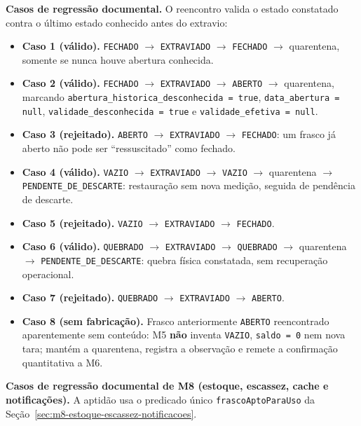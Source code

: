 \textbf{Casos de regressão documental.} O reencontro valida o estado constatado contra o último estado conhecido antes do extravio:
\begin{itemize}
    \item \textbf{Caso 1 (válido).} \texttt{FECHADO} $\rightarrow$ \texttt{EXTRAVIADO} $\rightarrow$ \texttt{FECHADO} $\rightarrow$ quarentena, somente se nunca houve abertura conhecida.
    \item \textbf{Caso 2 (válido).} \texttt{FECHADO} $\rightarrow$ \texttt{EXTRAVIADO} $\rightarrow$ \texttt{ABERTO} $\rightarrow$ quarentena, marcando \texttt{abertura\_historica\_desconhecida = true}, \texttt{data\_abertura = null}, \texttt{validade\_desconhecida = true} e \texttt{validade\_efetiva = null}.
    \item \textbf{Caso 3 (rejeitado).} \texttt{ABERTO} $\rightarrow$ \texttt{EXTRAVIADO} $\rightarrow$ \texttt{FECHADO}: um frasco já aberto não pode ser ``ressuscitado'' como fechado.
    \item \textbf{Caso 4 (válido).} \texttt{VAZIO} $\rightarrow$ \texttt{EXTRAVIADO} $\rightarrow$ \texttt{VAZIO} $\rightarrow$ quarentena $\rightarrow$ \texttt{PENDENTE\_DE\_DESCARTE}: restauração sem nova medição, seguida de pendência de descarte.
    \item \textbf{Caso 5 (rejeitado).} \texttt{VAZIO} $\rightarrow$ \texttt{EXTRAVIADO} $\rightarrow$ \texttt{FECHADO}.
    \item \textbf{Caso 6 (válido).} \texttt{QUEBRADO} $\rightarrow$ \texttt{EXTRAVIADO} $\rightarrow$ \texttt{QUEBRADO} $\rightarrow$ quarentena $\rightarrow$ \texttt{PENDENTE\_DE\_DESCARTE}: quebra física constatada, sem recuperação operacional.
    \item \textbf{Caso 7 (rejeitado).} \texttt{QUEBRADO} $\rightarrow$ \texttt{EXTRAVIADO} $\rightarrow$ \texttt{ABERTO}.
    \item \textbf{Caso 8 (sem fabricação).} Frasco anteriormente \texttt{ABERTO} reencontrado aparentemente sem conteúdo: M5 \textbf{não} inventa \texttt{VAZIO}, \texttt{saldo = 0} nem nova tara; mantém a quarentena, registra a observação e remete a confirmação quantitativa a M6.
\end{itemize}

\textbf{Casos de regressão documental de M8 (estoque, escassez, cache e notificações).} A aptidão usa o predicado único \texttt{frascoAptoParaUso} da Seção~\ref{sec:m8-estoque-escassez-notificacoes}.

